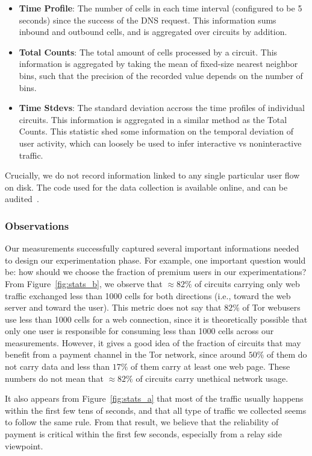 \begin{itemize}
\item \textbf{Time Profile}: The number of cells in each time interval
  (configured to be 5 seconds) since the success of the DNS request. This
  information sums inbound and outbound cells, and is aggregated over circuits
  by addition.
\item \textbf{Total Counts}: The total amount of cells processed by a
  circuit. This information is aggregated by taking the mean of fixed-size
  nearest neighbor bins, such that the precision of the recorded value depends
  on the number of bins.
\item \textbf{Time Stdevs}: The standard deviation accross the time profiles of
  individual circuits. This information is aggregated in a similar method as the
  Total Counts. This statistic shed some information on the temporal
  deviation of user activity, which can loosely be used to infer interactive vs
  noninteractive traffic.
\end{itemize} Crucially, we do not record information linked to any single
particular user flow on disk. The code used for the data collection is available
online, and can be audited~\cite{code-mt-stats}.

\subsubsection{Observations}

Our measurements successfully captured several important informations needed to
design our experimentation phase. For example, one important question would be:
how should we choose the fraction of premium users in our experimentations? From
Figure~\ref{fig:stats_b}, we observe that $\approx 82\%$ of circuits carrying
only web traffic exchanged less than 1000 cells for both directions (i.e.,
toward the web server and toward the user). This metric does not say that $82\%$
of Tor webusers use less than 1000 cells for a web connection, since it is
theoretically possible that only one user is responsible for consuming less than
1000 cells across our measurements. However, it gives a good idea of the
fraction of circuits that may benefit from a payment channel in the Tor network,
since around $50\%$ of them do not carry data and less than $17\%$ of them carry
at least one web page. These numbers do not mean that $\approx 82\%$ of circuits
carry unethical network usage.

It also appears from Figure~\ref{fig:stats_a} that most of the traffic usually
happens within the first few tens of seconds, and that all type of traffic we
collected seems to follow the same rule. From that result, we believe that the
reliability of payment is critical within the first few seconds, especially from
a relay side viewpoint.

